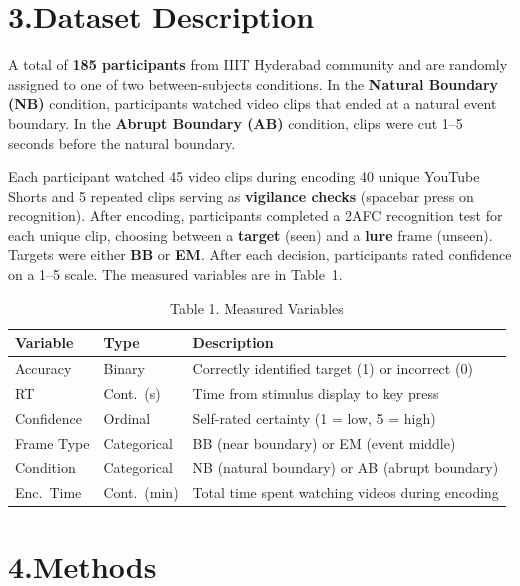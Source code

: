 \documentclass[11pt]{article}
\begin{document}
\section*{3.\quad Dataset Description}

A total of \textbf{185 participants} from IIIT Hyderabad community and are randomly assigned to one of two between-subjects conditions. In the \textbf{Natural Boundary (NB)} condition, participants watched video clips that ended at a natural event boundary. In the \textbf{Abrupt Boundary (AB)} condition, clips were cut 1--5 seconds before the natural boundary.

Each participant watched 45 video clips during encoding 40 unique YouTube Shorts and 5 repeated clips serving as \textbf{vigilance checks} (spacebar press on recognition). After encoding, participants completed a 2AFC recognition test for each unique clip, choosing between a \textbf{target} (seen) and a \textbf{lure} frame (unseen). Targets were either \textbf{BB} or \textbf{EM}. After each decision, participants rated confidence on a 1--5 scale. The measured variables are in Table~1.

\begin{table}[H]
\centering
\small
\caption*{Table 1.\; Measured Variables}
\begin{tabularx}{\textwidth}{@{} l L{2.2cm} X @{}}
\toprule
\textbf{Variable} & \textbf{Type} & \textbf{Description} \\
\midrule
Accuracy    & Binary        & Correctly identified target (1) or incorrect (0) \\
RT          & Cont.\ (s)    & Time from stimulus display to key press \\
Confidence  & Ordinal       & Self-rated certainty (1 = low, 5 = high) \\
Frame Type  & Categorical   & BB (near boundary) or EM (event middle) \\
Condition   & Categorical   & NB (natural boundary) or AB (abrupt boundary) \\
Enc.\ Time  & Cont.\ (min)  & Total time spent watching videos during encoding \\
\bottomrule
\end{tabularx}
\end{table}

\section*{4.\quad Methods}
\end{document}
